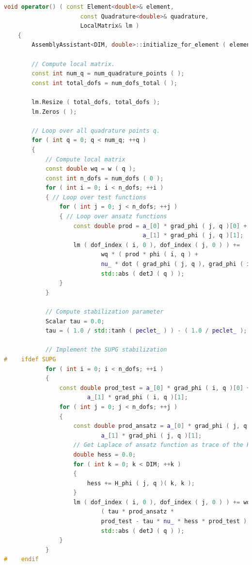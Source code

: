 \documentclass[a4paper, 11pt, twoside]{article}
\begin{document}
\begin{lstlisting}[language=C++, basicstyle={\footnotesize, \ttfamily}, keywordstyle=\color{blue}, numbers=none, tabsize=4]
    void operator() ( const Element<double>& element,
                      const Quadrature<double>& quadrature, 
                      LocalMatrix& lm )
    {
        AssemblyAssistant<DIM, double>::initialize_for_element ( element, quadrature );

        // Compute local matrix.
        const int num_q = num_quadrature_points ( );
        const int total_dofs = num_dofs_total ( );

        lm.Resize ( total_dofs, total_dofs );
        lm.Zeros ( );

        // Loop over all quadrature points q.
        for ( int q = 0; q < num_q; ++q )
        {
            // Compute local matrix
            const double wq = w ( q );
            const int n_dofs = num_dofs ( 0 );
            for ( int i = 0; i < n_dofs; ++i )
            { // Loop over test functions
                for ( int j = 0; j < n_dofs; ++j )
                { // Loop over ansatz functions
                    const double prod = a_[0] * grad_phi ( j, q )[0] +
                                        a_[1] * grad_phi ( j, q )[1];
                    lm ( dof_index ( i, 0 ), dof_index ( j, 0 ) ) += 
                            wq * ( prod * phi ( i, q ) +
                            nu_ * dot ( grad_phi ( j, q ), grad_phi ( i, q ))) * 
                            std::abs ( detJ ( q ) );
                }
            }

            // Compute stabilization parameter
            Scalar tau = 0.0;
            tau = ( 1.0 / std::tanh ( peclet_ ) ) - ( 1.0 / peclet_ );

            // Implement the SUPG stabilization
#    ifdef SUPG
            for ( int i = 0; i < n_dofs; ++i )
            {
                const double prod_test = a_[0] * grad_phi ( i, q )[0] +
                        a_[1] * grad_phi ( i, q )[1];
                for ( int j = 0; j < n_dofs; ++j )
                {
                    const double prod_ansatz = a_[0] * grad_phi ( j, q )[0] +
                            a_[1] * grad_phi ( j, q )[1];
                    // Get Laplace of ansatz function as trace of the Hessian matrix
                    double hess = 0.0;
                    for ( int k = 0; k < DIM; ++k )
                    {
                        hess += H_phi ( j, q )( k, k );
                    }
                    lm ( dof_index ( i, 0 ), dof_index ( j, 0 ) ) += wq * 
                            ( tau * prod_ansatz *
                            prod_test - tau * nu_ * hess * prod_test ) * 
                            std::abs ( detJ ( q ) );
                }
            }
#    endif


\end{lstlisting}
\end{document}
